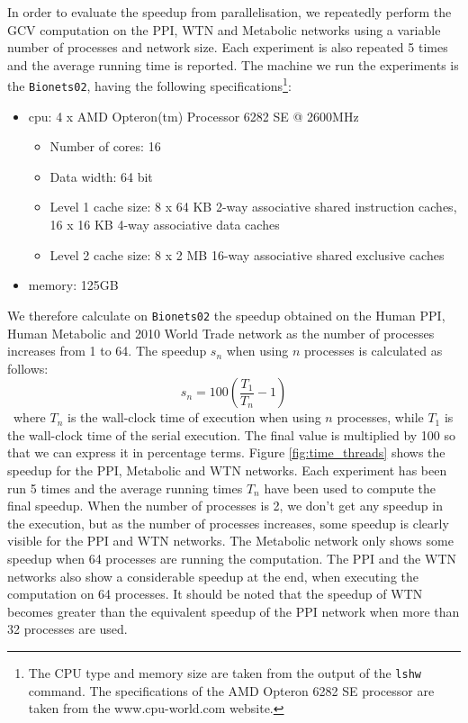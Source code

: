 In order to evaluate the speedup from parallelisation, we repeatedly perform the GCV computation on the PPI, WTN and Metabolic networks using a variable number of processes and network size. Each experiment is also repeated 5 times and the average running time is reported. The machine we run the experiments is the \lstinline|Bionets02|, having the following specifications\footnote{The CPU type and memory size are taken from the output of the \lstinline|lshw| command. The specifications of the AMD Opteron 6282 SE processor are taken from the www.cpu-world.com website.}:
\begin{itemize}
 \item cpu: 4 x AMD Opteron(tm) Processor 6282 SE @ 2600MHz
 \begin{itemize}
  \item Number of cores: 16 
  \item Data width: 64 bit
  \item Level 1 cache size: 8 x 64 KB 2-way associative shared instruction caches, 16 x 16 KB 4-way associative data caches
  \item Level 2 cache size: 8 x 2 MB 16-way associative shared exclusive caches
 \end{itemize}
 \item memory: 125GB
\end{itemize}


We therefore calculate on \lstinline|Bionets02| the speedup obtained on the Human PPI, Human Metabolic and 2010 World Trade network as the number of processes increases from 1 to 64. The speedup $s_n$ when using $n$ processes is calculated as follows:
$$ s_n = 100\left(\frac{T_{1}}{T_{n}} - 1\right)$$\
where $T_{n}$ is the wall-clock time of execution when using $n$ processes, while $T_1$ is the wall-clock time of the serial execution. The final value is multiplied by 100 so that we can express it in percentage terms. Figure \ref{fig:time_threads} shows the speedup for the PPI, Metabolic and WTN networks. Each experiment has been run 5 times and the average running times $T_n$ have been used to compute the final speedup. When the number of processes is 2, we don't get any speedup in the execution, but as the number of processes increases, some speedup is clearly visible for the PPI and WTN networks. The Metabolic network only shows some speedup when 64 processes are running the computation. The PPI and the WTN networks also show a considerable speedup at the end, when executing the computation on 64 processes. It should be noted that the speedup of WTN becomes greater than the equivalent speedup of the PPI network when more than 32 processes are used.

